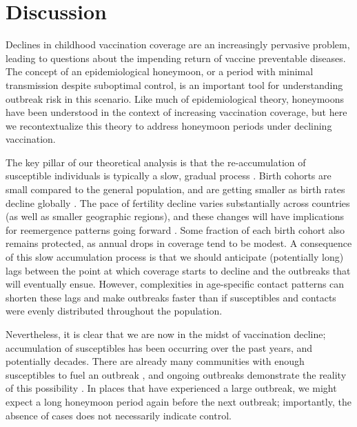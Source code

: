 \section{Discussion}
\label{sec:discussion}

Declines in childhood vaccination coverage are an increasingly pervasive problem, leading to questions about the impending return of vaccine preventable diseases. The concept of an epidemiological honeymoon, or a period with minimal transmission despite suboptimal control, is an important tool for understanding outbreak risk in this scenario. Like much of epidemiological theory, honeymoons have been understood in the context of increasing vaccination coverage, but here we recontextualize this theory to address honeymoon periods under declining vaccination.

The key pillar of our theoretical analysis is that the re-accumulation of susceptible individuals is typically a slow, gradual process \citep{MetcalfEtAl2020,KiangEtAl2025}. Birth cohorts are small compared to the general population, and are getting smaller as birth rates decline globally \citep{BhattacharjeeEtAl2024}. The pace of fertility decline varies substantially across countries (as well as smaller geographic regions), and these changes will have implications for reemergence patterns going forward \citep{BakerEtAl2022}. Some fraction of each birth cohort also remains protected, as annual drops in coverage tend to be modest. A consequence of this slow accumulation process is that we should anticipate (potentially long) lags between the point at which coverage starts to decline and the outbreaks that will eventually ensue. However, complexities in age-specific contact patterns can shorten these lags and make outbreaks faster than if susceptibles and contacts were evenly distributed throughout the population.

Nevertheless, it is clear that we are now in the midst of vaccination decline; accumulation of susceptibles has been occurring over the past years, and potentially decades. There are already many communities with enough susceptibles to fuel an outbreak \citep{ChenBento2026,ZhouEtAl2026,DongEtAl2025}, and ongoing outbreaks demonstrate the reality of this possibility \citep{DoMulholland2025}. In places that have experienced a large outbreak, we might expect a long honeymoon period again before the next outbreak; importantly, the absence of cases does not necessarily indicate control. 

